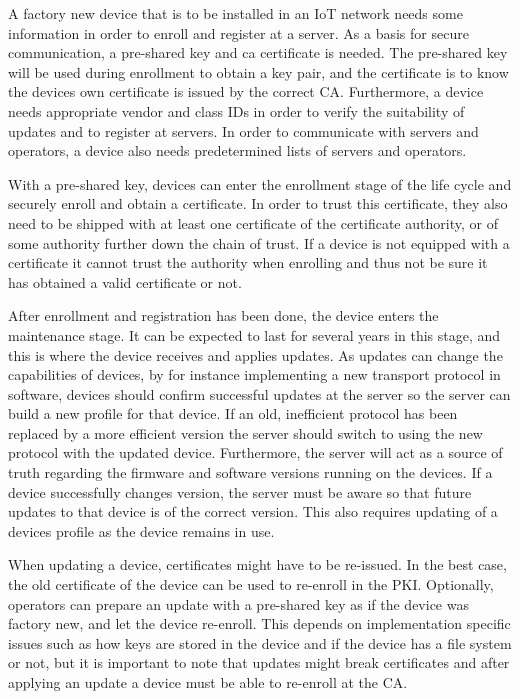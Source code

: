 \documentclass[0-thesis.tex]{subfiles}
\begin{document}
A factory new device that is to be installed in an IoT network needs some information in
order to enroll and register at a server. As a basis for secure communication, a
pre-shared key and \gls{ca} certificate is needed. The pre-shared key will be used during
enrollment to obtain a key pair, and the certificate is to know the devices own
certificate is issued by the correct CA. Furthermore, a device needs appropriate vendor
and class IDs in order to verify the suitability of updates and to register at servers. In
order to communicate with servers and operators, a device also needs predetermined lists
of servers and operators. 

With a pre-shared key, devices can enter the enrollment stage of the life cycle and
securely enroll and obtain a certificate. In order to trust this certificate, they also
need to be shipped with at least one certificate of the certificate authority, or of some
authority further down the chain of trust. If a device is not equipped with a certificate
it cannot trust the authority when enrolling and thus not be sure it has obtained a valid
certificate or not.

After enrollment and registration has been done, the device enters the maintenance stage.
It can be expected to last for several years in this stage, and this is where the device
receives and applies updates. As updates can change the capabilities of devices, by for
instance implementing a new transport protocol in software, devices should confirm
successful updates at the server so the server can build a new profile for that device. If
an old, inefficient protocol has been replaced by a more efficient version the server
should switch to using the new protocol with the updated device. Furthermore, the server
will act as a source of truth regarding the firmware and software versions running on the
devices. If a device successfully changes version, the server must be aware so that future
updates to that device is of the correct version. This also requires updating of a devices
profile as the device remains in use. 

When updating a device, certificates might have to be re-issued. In the best case, the old
certificate of the device can be used to re-enroll in the PKI. Optionally, operators can
prepare an update with a pre-shared key as if the device was factory new, and let the
device re-enroll. This depends on implementation specific issues such as how keys are
stored in the device and if the device has a file system or not, but it is important to
note that updates might break certificates and after applying an update a device must be
able to re-enroll at the CA.
\end{document}
